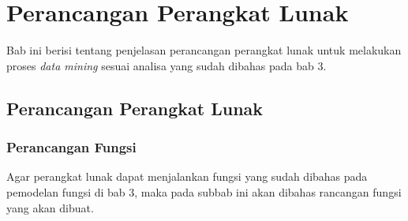 \chapter{Perancangan Perangkat Lunak}

Bab ini berisi tentang penjelasan perancangan perangkat lunak untuk melakukan proses \textsl{data mining} sesuai analisa yang sudah dibahas pada bab 3.

\section{Perancangan Perangkat Lunak}

\subsection{Perancangan Fungsi}
Agar perangkat lunak dapat menjalankan fungsi yang sudah dibahas pada pemodelan fungsi di bab 3, maka pada subbab ini akan dibahas rancangan fungsi yang akan dibuat.

